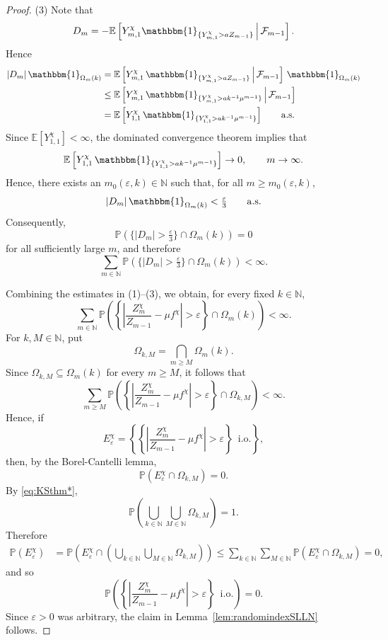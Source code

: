 \documentclass[10pt,a4paper]{amsart}
\newcommand{\EE}{\mathbb E}
\newcommand{\N}{\mathbb N}
\newcommand{\PP}{\mathbb{P}}
\begin{document}
\begin{proof}
\medskip\noindent
(3) Note that
\[
D_m = -\EE\left[ Y^{\chi}_{m,1}\mathbbm{1}_{\{Y^{\chi}_{m,1}>aZ_{m-1}\}} \,\middle|\, \mathcal{F}_{m-1} \right].
\]
Hence
\[
\begin{aligned}
|D_m|\, \mathbbm{1}_{\Omega_m(k)}
&
= \EE\left[ Y_{m,1}^{\chi} \, \mathbbm{1}_{\{Y_{m,1}^{\chi}>aZ_{m-1}\}} \,\middle|\, \mathcal{F}_{m-1} \right]\, \mathbbm{1}_{\Omega_m(k)}
\\&
\leq \EE\left[ Y_{m,1}^{\chi}\, \mathbbm{1}_{\{Y_{m,1}^{\chi} > ak^{-1}\mu^{m-1}\}} \,\middle|\, \mathcal{F}_{m-1} \right]  
\\&
= \EE\left[ Y_{1,1}^{\chi}\, \mathbbm{1}_{\{Y_{1,1}^{\chi}>ak^{-1}\mu^{m-1}\}} \right]
\qquad \mathrm{a.s.}
\end{aligned}
\]
Since $\EE[Y_{1,1}^{\chi}]<\infty$, the dominated convergence theorem implies that
\[
\EE\left[ Y_{1,1}^{\chi}\, \mathbbm{1}_{\{Y_{1,1}^{\chi} > ak^{-1}\mu^{m-1}\}} \right] \to 0, \qquad m\to\infty.
\]
Hence, there exists an $m_0(\varepsilon,k)\in\N$ such that, for all $m\geq m_0(\varepsilon,k)$,
\[
|D_m| \, \mathbbm{1}_{\Omega_m(k)} < \tfrac{\varepsilon}{3} \qquad \mathrm{a.s.}
\]
Consequently,
\[
\PP\left( \{|D_m|>\tfrac{\varepsilon}{3}\}\cap\Omega_m(k) \right) = 0
\]
for all sufficiently large $m$, and therefore
\[
\sum_{m\in\N} \PP\left( \{|D_m|>\tfrac{\varepsilon}{3}\}\cap\Omega_m(k) \right) < \infty.
\]


\medskip 
Combining the estimates in (1)--(3), we obtain, for every fixed $k\in\N$,
\[
\sum_{m\in\N} \PP\left( \left\{ \left| \frac{Z_m^\chi}{Z_{m-1}} - \mu f^\chi \right|>\varepsilon \right\} \cap \Omega_m(k) \right) <\infty.
\]
For $k,M\in\N$, put
\[
\Omega_{k,M} = \bigcap_{m\geq M} \Omega_m(k).
\]
Since $\Omega_{k,M}\subseteq \Omega_m(k)$ for every $m\geq M$, it follows that
\[
\sum_{m\geq M} \PP\left( \left\{ \left| \frac{Z_m^\chi}{Z_{m-1}}-\mu f^{\chi} \right|>\varepsilon \right\} \cap \Omega_{k,M} \right) < \infty.
\]
Hence, if
\[
E_{\varepsilon}^{\chi} = \left\{\left\{ \left| \frac{Z_m^{\chi}}{Z_{m-1}}-\mu f^{\chi} \right| > \varepsilon \right\}
\,\,\, \mathrm{i.o.}\right\},
\]
then, by the Borel-Cantelli lemma,
\[
\PP\left(E_{\varepsilon}^{\chi} \cap \Omega_{k,M} \right)=0.
\]
By \eqref{eq:KSthm*},
\[
\PP\left( \bigcup_{k\in\N}\bigcup_{M\in\N}\Omega_{k,M} \right) = 1.
\]
Therefore
\[
\begin{aligned}
\PP\left(E_{\varepsilon}^{\chi}\right)
&=
\PP\left(E_{\varepsilon}^{\chi}\cap\left(\bigcup_{k\in\N}\bigcup_{M\in\N}\Omega_{k,M}\right)\right) 
\leq\sum_{k\in\N}\sum_{M\in\N}\PP\left(E_{\varepsilon}^{\chi}\cap \Omega_{k,M}\right)=0,
\end{aligned}
\]
and so
\[
\PP \left(\left\{ \left| \frac{Z_m^{\chi}}{Z_{m-1}}-\mu f^{\chi} \right| > \varepsilon \right\}
\,\,\, \mathrm{i.o.}\right) = 0.
\]
Since $\varepsilon>0$ was arbitrary, the claim in Lemma~\ref{lem:randomindexSLLN} follows.
\end{proof}
\end{document}
